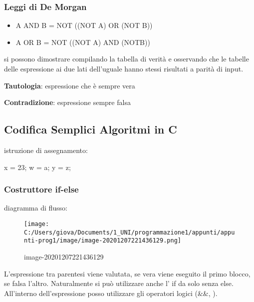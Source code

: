 \documentclass[
]{article}
\newenvironment{Shaded}{}{}
\newcommand{\CharTok}[1]{\textcolor[rgb]{0.25,0.44,0.63}{#1}}
\newcommand{\DecValTok}[1]{\textcolor[rgb]{0.25,0.63,0.44}{#1}}
\newcommand{\NormalTok}[1]{#1}
\begin{document}
\hypertarget{header-n358}{%
\subsubsection{Leggi di De Morgan}\label{header-n358}}

\begin{itemize}
\item
  A AND B = NOT ((NOT A) OR (NOT B))
\item
  A OR B = NOT ((NOT A) AND (NOTB))
\end{itemize}

si possono dimostrare compilando la tabella di verità e osservando che
le tabelle delle espressione ai due lati dell'uguale hanno stessi
risultati a parità di input.

\textbf{Tautologia}: espressione che è sempre vera

\textbf{Contradizione}: espressione sempre falsa

\hypertarget{header-n367}{%
\subsection{Codifica Semplici Algoritmi in C}\label{header-n367}}

istruzione di assegnamento:

\begin{Shaded}
\begin{Highlighting}[]
\NormalTok{x = }\DecValTok{23}\NormalTok{;}
\NormalTok{w = }\CharTok{\textquotesingle{}a\textquotesingle{}}\NormalTok{;}
\NormalTok{y = z;}
\end{Highlighting}
\end{Shaded}

\hypertarget{header-n371}{%
\subsubsection{Costruttore if-else}\label{header-n371}}

diagramma di flusso:

\begin{figure}
\centering
\texttt{[image: C:/Users/giova/Documents/1\_UNI/programmazione1/appunti/appunti-prog1/image/image-20201207221436129.png]}
\caption{image-20201207221436129}
\end{figure}

L'espressione tra parentesi viene valutata, se vera viene eseguito il
primo blocco, se falsa l'altro. Naturalmente si può utilizzare anche l'
if da solo senza else. All'interno dell'espressione posso utilizzare gli
operatori logici (\&\&, \textbar\textbar).
\end{document}
